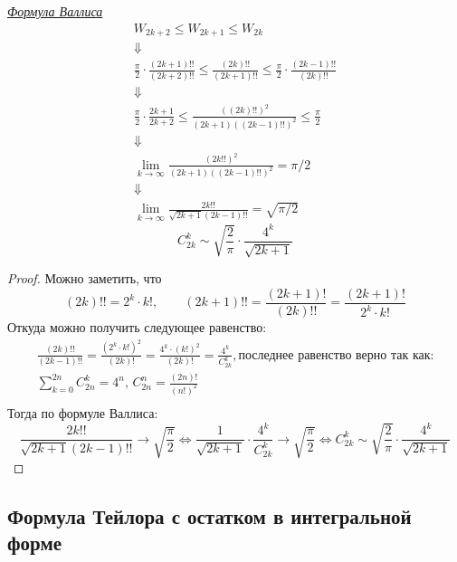 \begin{example}
\underline{\textit{Формула Валлиса}}
\[
    \begin{gathered}
        W_{2k + 2} \leqslant W_{2k + 1} \leqslant W_{2k}\\
        \Downarrow\\
        \frac{\pi}{2} \cdot \frac{(2k + 1)!!}{(2k + 2)!!} \leqslant \frac{(2k)!!}{(2k + 1)!!} \leqslant
        \frac{\pi}{2} \cdot \frac{(2k - 1)!!}{(2k)!!}\\
        \Downarrow\\
        \frac{\pi}{2} \cdot \frac{2k + 1}{2k + 2} \leqslant \frac{((2k)!!)^2}{(2k + 1)((2k - 1)!!) ^ 2} \leqslant \frac{\pi}{2}\\
        \Downarrow\\
        \lim_{k \to \infty} \frac{(2k!!)^2}{(2k + 1)((2k - 1)!!) ^ 2} = \pi / 2\\
        \Downarrow\\
        \lim_{k \to \infty} \frac{2k!!}{\sqrt{2k + 1}(2k - 1)!!} = \sqrt{\pi / 2}
    \end{gathered}
\]
\follow 
\[
    C_{2k}^k \sim \sqrt{\frac{2}{\pi}} \cdot \frac{4 ^ k}{\sqrt{2k + 1}}
\]
\begin{proof}
     Можно заметить, что
    \[
        (2k)!! = 2 ^ k \cdot k!,\qquad
        (2k + 1)!! = \frac{(2k + 1)!}{(2k)!!} = \frac{(2k + 1)!}{2^k \cdot k!}
    \]
    Откуда можно получить следующее равенство:
    \[
        \begin{gathered}
            \frac{(2k)!!}{(2k - 1)!!} = \frac{(2^k \cdot k!)^2}{(2k)!} = \frac{4 ^ k \cdot (k!)^2}{(2k)!}
            = \frac{4 ^ k}{C_{2k}^k}, \text{последнее равенство верно так как:}\\
            \sum_{k = 0}^{2n} C_{2n}^{k} = 4 ^ n, \,
            C_{2n}^n = \frac{(2n)!}{(n!)^2}\\
        \end{gathered}
    \]
    Тогда по формуле Валлиса:
    \[
        \frac{2k!!}{\sqrt{2k + 1}(2k - 1)!!} \to \sqrt{\frac{\pi}{2}}
        \Leftrightarrow 
        \frac{1}{\sqrt{2k + 1}} \cdot \frac{4 ^ k}{C_{2k}^k} \to \sqrt{\frac{\pi}{2}}
        \Leftrightarrow 
        C_{2k}^k \sim \sqrt{\frac{2}{\pi}} \cdot \frac{4 ^ k}{\sqrt{2k + 1}}
    \]
\end{proof}
\end{example}
\newpage

\subsection{Формула Тейлора с остатком в интегральной форме}

